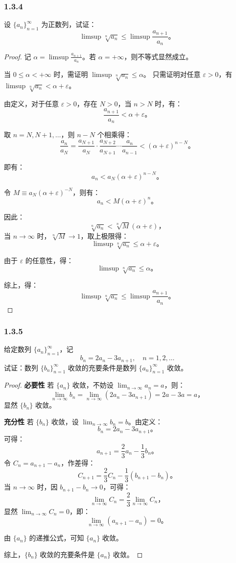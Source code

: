 \documentclass[12pt]{ctexart}
\begin{document}
\subsubsection*{1.3.4} 
设 $\{a_n\}_{n=1}^\infty$ 为正数列，试证：
\[
\limsup \sqrt[n]{a_n} \leq \limsup \frac{a_{n+1}}{a_n}。
\]
\begin{proof}
记 $\alpha = \limsup \frac{a_{n+1}}{a_n}$。若 $\alpha = +\infty$，则不等式显然成立。

当 $0 \leq \alpha < +\infty$ 时，需证明 $\limsup \sqrt[n]{a_n} \leq \alpha$。  
只需证明对任意 $\varepsilon > 0$，有 $\limsup \sqrt[n]{a_n} < \alpha + \varepsilon$。

由定义，对于任意 $\varepsilon > 0$，存在 $N > 0$，当 $n > N$ 时，有：
\[
\frac{a_{n+1}}{a_n} < \alpha + \varepsilon。
\]

取 $n = N, N+1, \ldots$，则 $n-N$ 个相乘得：
\[
\frac{a_n}{a_N} = \frac{a_{N+1}}{a_N} \cdot \frac{a_{N+2}}{a_{N+1}} \cdots \frac{a_n}{a_{n-1}} < (\alpha + \varepsilon)^{n-N}。
\]

即有：
\[
a_n < a_N (\alpha + \varepsilon)^{n-N}。
\]

令 $M \equiv a_N (\alpha + \varepsilon)^{-N}$，则有：
\[
a_n < M (\alpha + \varepsilon)^n。
\]

因此：
\[
\sqrt[n]{a_n} < \sqrt[n]{M} (\alpha + \varepsilon)，
\]
当 $n \to \infty$ 时，$\sqrt[n]{M} \to 1$，取上极限得：
\[
\limsup \sqrt[n]{a_n} \leq \alpha + \varepsilon。
\]

由于 $\varepsilon$ 的任意性，得：
\[
\limsup \sqrt[n]{a_n} \leq \alpha。
\]

综上，得：
\[
\limsup \sqrt[n]{a_n} \leq \limsup \frac{a_{n+1}}{a_n}。
\]
\end{proof}

\subsubsection*{1.3.5} 
给定数列 $\{a_n\}_{n=1}^\infty$，记
\[
b_n = 2a_n - 3a_{n+1}, \quad n = 1, 2, \ldots
\]
试证：数列 $\{b_n\}_{n=1}^\infty$ 收敛的充要条件是数列 $\{a_n\}_{n=1}^\infty$ 收敛。
\begin{proof}
\textbf{必要性}  
若 $\{a_n\}$ 收敛，不妨设 $\lim_{n \to \infty} a_n = a$，则：
\[
\lim_{n \to \infty} b_n = \lim_{n \to \infty} (2a_n - 3a_{n+1}) = 2a - 3a = a，
\]
显然 $\{b_n\}$ 收敛。

\textbf{充分性}  
若 $\{b_n\}$ 收敛，设 $\lim_{n \to \infty} b_n = b$。由定义：
\[
b_n = 2a_n - 3a_{n+1}。
\]
可得：
\[
a_{n+1} = \frac{2}{3}a_n - \frac{1}{3}b_n。
\]
令 $C_n = a_{n+1} - a_n$，作差得：
\[
C_{n+1} = \frac{2}{3}C_n - \frac{1}{3}(b_{n+1} - b_n)。
\]
当 $n \to \infty$ 时，因 $b_{n+1} - b_n \to 0$，可得：
\[
\lim_{n \to \infty} C_n = \frac{2}{3} \lim_{n \to \infty} C_n，
\]
显然 $\lim_{n \to \infty} C_n = 0$，即：
\[
\lim_{n \to \infty} (a_{n+1} - a_n) = 0。
\]

由 $\{a_n\}$ 的递推公式，可知 $\{a_n\}$ 收敛。

综上，$\{b_n\}$ 收敛的充要条件是 $\{a_n\}$ 收敛。
\end{proof}
\end{document}
